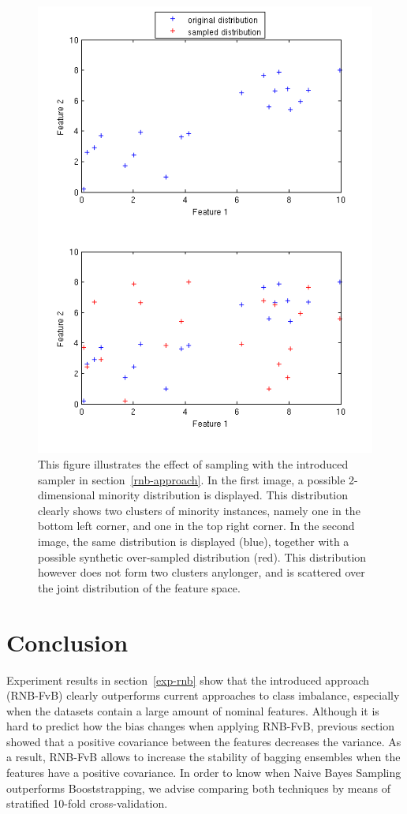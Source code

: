 \begin{figure}[h]
\includegraphics[scale=0.75]{img/nb_featureSampling.png}
\caption{This figure illustrates the effect of sampling with the introduced sampler in section~\ref{rnb-approach}. In the first image, a possible 2-dimensional minority distribution is displayed. This distribution clearly shows two clusters of minority instances, namely one in the bottom left corner, and one in the top right corner. In the second image, the same distribution is displayed (blue), together with a possible synthetic over-sampled distribution (red). This distribution however does not form two clusters anylonger, and is scattered over the joint distribution of the feature space.}
\label{fig:NBS}
\end{figure}




\section{Conclusion}\label{rnb-conclusion}
Experiment results in section~\ref{exp-rnb} show that the introduced approach (RNB-FvB) clearly outperforms current approaches to class imbalance, especially when the datasets contain a large amount of nominal features. Although it is hard to predict how the bias changes when applying RNB-FvB, previous section showed that a positive covariance between the features decreases the variance. As a result, RNB-FvB allows to increase the stability of bagging ensembles when the features have a positive covariance. In order to know when Naive Bayes Sampling outperforms Booststrapping, we advise comparing both techniques by means of stratified 10-fold cross-validation.

